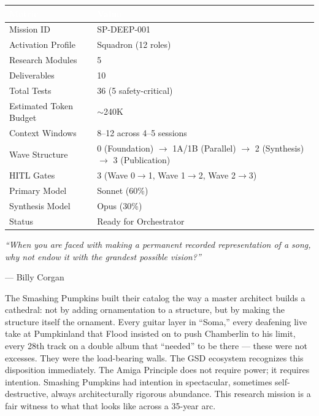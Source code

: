 \documentclass[11pt,letterpaper]{article}
\newcommand{\tableheader}[1]{\textbf{\sffamily\textcolor{white}{#1}}}
\begin{document}
\begin{center}
\begin{tabularx}{\textwidth}{L{4cm}X}
\toprule
{}
\tableheader{Metric} & \tableheader{Value} \\
\midrule
Mission ID & SP-DEEP-001 \\
Activation Profile & Squadron (12 roles) \\
Research Modules & 5 \\
Deliverables & 10 \\
Total Tests & 36 (5 safety-critical) \\
Estimated Token Budget & $\sim$240K \\
Context Windows & 8--12 across 4--5 sessions \\
Wave Structure & 0 (Foundation) $\to$ 1A/1B (Parallel) $\to$ 2 (Synthesis) $\to$ 3 (Publication) \\
HITL Gates & 3 (Wave 0$\to$1, Wave 1$\to$2, Wave 2$\to$3) \\
Primary Model & Sonnet (60\%) \\
Synthesis Model & Opus (30\%) \\
Status & Ready for Orchestrator \\
\bottomrule
\end{tabularx}
\end{center}

\vspace{2em}

\begin{quotebox}
\textit{``When you are faced with making a permanent recorded representation of a song, why not endow it with the grandest possible vision?''}

\vspace{0.5em}
\hfill --- Billy Corgan

\vspace{0.8em}
\noindent The Smashing Pumpkins built their catalog the way a master architect builds a cathedral: not by adding ornamentation to a structure, but by making the structure itself the ornament. Every guitar layer in ``Soma,'' every deafening live take at Pumpkinland that Flood insisted on to push Chamberlin to his limit, every 28th track on a double album that ``needed'' to be there --- these were not excesses. They were the load-bearing walls. The GSD ecosystem recognizes this disposition immediately. The Amiga Principle does not require power; it requires intention. Smashing Pumpkins had intention in spectacular, sometimes self-destructive, always architecturally rigorous abundance. This research mission is a fair witness to what that looks like across a 35-year arc.
\end{quotebox}
\end{document}
